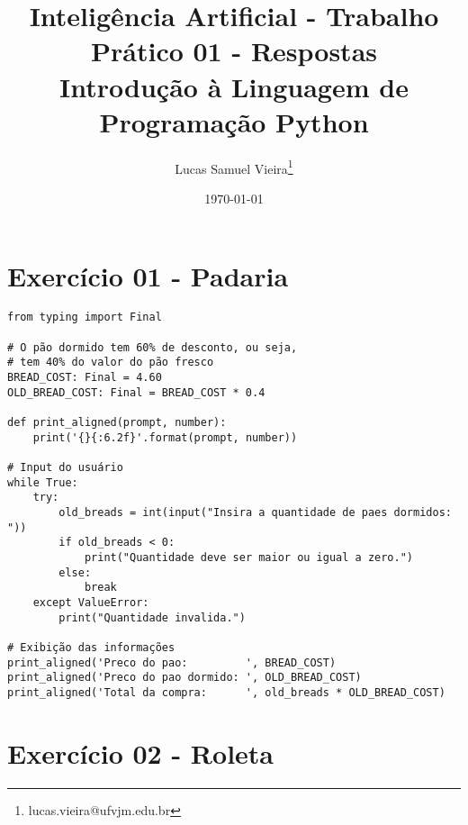 \documentclass[article, a4paper, oneside, 11pt, english, brazil, sumario=tradicional]{abntex2}
\author{Lucas Samuel Vieira\thanks{lucas.vieira@ufvjm.edu.br}}
\date{\today}
\title{Inteligência Artificial - Trabalho Prático 01 - Respostas\\\medskip
\large Introdução à Linguagem de Programação Python}
\begin{document}
\maketitle
\OnehalfSpacing
\pretextual
\textual

\section{Exercício 01 - Padaria}
\label{sec:org81f226d}

\begin{verbatim}
from typing import Final

# O pão dormido tem 60% de desconto, ou seja,
# tem 40% do valor do pão fresco
BREAD_COST: Final = 4.60
OLD_BREAD_COST: Final = BREAD_COST * 0.4

def print_aligned(prompt, number):
    print('{}{:6.2f}'.format(prompt, number))

# Input do usuário
while True:
    try:
        old_breads = int(input("Insira a quantidade de paes dormidos: "))
        if old_breads < 0:
            print("Quantidade deve ser maior ou igual a zero.")
        else:
            break
    except ValueError:
        print("Quantidade invalida.")

# Exibição das informações
print_aligned('Preco do pao:         ', BREAD_COST)
print_aligned('Preco do pao dormido: ', OLD_BREAD_COST)
print_aligned('Total da compra:      ', old_breads * OLD_BREAD_COST)
\end{verbatim}

\newpage
\section{Exercício 02 - Roleta}
\label{sec:org412f213}
\end{document}
